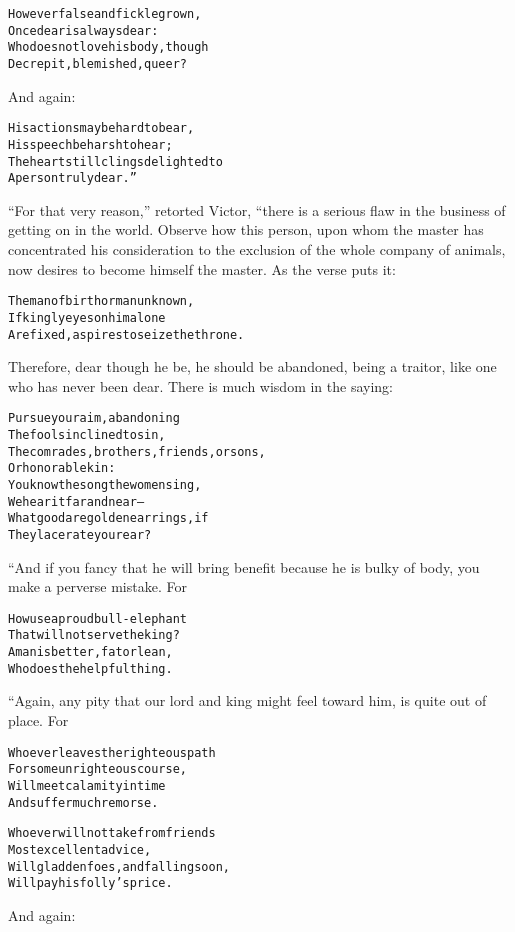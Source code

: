 \documentclass{article}
\renewenvironment{verbatim}{\begin{alltt}\normalfont\begin{centering}}{\end{centering}\end{alltt}}
\begin{document}
\begin{verbatim}
However false and fickle grown,
    Once dear is always dear:
Who does not love his body, though
    Decrepit, blemished, queer?
\end{verbatim}
And again:

\begin{verbatim}
His actions may be hard to bear,
    His speech be harsh to hear;
The heart still clings delighted to
    A person truly dear.”
\end{verbatim}
``For that very reason,'' retorted Victor, “there is a serious flaw
in the business of getting on in the world. Observe how this
person, upon whom the master has concentrated his consideration to
the exclusion of the whole company of animals, now desires to
become himself the master. As the verse puts it:

\begin{verbatim}
The man of birth or man unknown,
If kingly eyes on him alone
Are fixed, aspires to seize the throne.
\end{verbatim}
Therefore, dear though he be, he should be abandoned, being a
traitor, like one who has never been dear. There is much wisdom in
the saying:

\begin{verbatim}
Pursue your aim, abandoning
    The fools inclined to sin,
The comrades, brothers, friends, or sons,
    Or honorable kin:
You know the song the women sing,
    We hear it far and near--
What good are golden earrings, if
    They lacerate your ear?
\end{verbatim}
“And if you fancy that he will bring benefit because he is bulky of
body, you make a perverse mistake. For

\begin{verbatim}
How use a proud bull-elephant
    That will not serve the king?
A man is better, fat or lean,
    Who does the helpful thing.
\end{verbatim}
“Again, any pity that our lord and king might feel toward him, is
quite out of place. For

\begin{verbatim}
Whoever leaves the righteous path
    For some unrighteous course,
Will meet calamity in time
    And suffer much remorse.

Whoever will not take from friends
    Most excellent advice,
Will gladden foes, and falling soon,
    Will pay his folly's price.
\end{verbatim}
And again:
\end{document}

